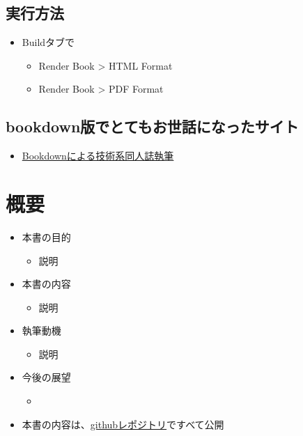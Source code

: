 \documentclass[
  b5paper,
  xelatex, ja=standard]{bxjsbook}
\providecommand{\tightlist}{%
  \setlength{\itemsep}{0pt}\setlength{\parskip}{0pt}}\usepackage{longtable,booktabs,array}
\begin{document}
\subsection*{実行方法}\label{ux5b9fux884cux65b9ux6cd5}

\begin{itemize}
\tightlist
\item
  Buildタブで

  \begin{itemize}
  \tightlist
  \item
    Render Book \textgreater{} HTML Format
  \item
    Render Book \textgreater{} PDF Format
  \end{itemize}
\end{itemize}

\subsection*{bookdown版でとてもお世話になったサイト}\label{bookdownux7248ux3067ux3068ux3066ux3082ux304aux4e16ux8a71ux306bux306aux3063ux305fux30b5ux30a4ux30c8}

\begin{itemize}
\tightlist
\item
  \href{https://teastat.blogspot.com/2019/01/bookdown.html}{Bookdownによる技術系同人誌執筆}
\end{itemize}

\section*{概要}\label{ux6982ux8981}


\begin{itemize}
\tightlist
\item
  本書の目的

  \begin{itemize}
  \tightlist
  \item
    説明
  \end{itemize}
\item
  本書の内容

  \begin{itemize}
  \tightlist
  \item
    説明
  \end{itemize}
\item
  執筆動機

  \begin{itemize}
  \tightlist
  \item
    説明
  \end{itemize}
\item
  今後の展望

  \begin{itemize}
  \tightlist
  \item
  \end{itemize}
\item
  本書の内容は、\href{url}{githubレポジトリ}ですべて公開
\end{itemize}
\end{document}
